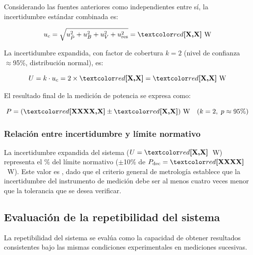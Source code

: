 Considerando las fuentes anteriores como independientes entre sí,
la incertidumbre estándar combinada es:

\begin{equation}
    u_c = \sqrt{u_{\bar{P}}^2 + u_B^2 + u_V^2 + u_{\text{res}}^2}
        = \PLACEHOLDER{X{,}X}~\text{W}
    \label{eq:incertidumbre_combinada}
\end{equation}

La incertidumbre expandida, con factor de cobertura $k=2$
(nivel de confianza $\approx$95\%, distribución normal), es:

\begin{equation}
    U = k \cdot u_c = 2 \times \PLACEHOLDER{X{,}X}
      = \PLACEHOLDER{X{,}X}~\text{W}
    \label{eq:incertidumbre_expandida}
\end{equation}

El resultado final de la medición de potencia se expresa como:

\begin{equation}
    P = (\PLACEHOLDER{XXXX{,}X} \pm \PLACEHOLDER{X{,}X})~\text{W}
        \quad (k=2,\; p \approx 95\%)
    \label{eq:resultado_final}
\end{equation}

\subsubsection{Relación entre incertidumbre y límite normativo}

La incertidumbre expandida del sistema ($U = \PLACEHOLDER{X{,}X}$~W)
representa el \% del límite normativo
($\pm$10\% de $P_{\text{dec}} = \PLACEHOLDER{XXXX}$~W).
Este valor es ,
dado que el criterio general de metrología establece que la
incertidumbre del instrumento de medición debe ser al menos
cuatro veces menor que la tolerancia que se desea verificar.

\subsection{Evaluación de la repetibilidad del sistema}
\label{subsec:repetibilidad}

La repetibilidad del sistema se evalúa como la capacidad de
obtener resultados consistentes bajo las mismas condiciones
experimentales en mediciones sucesivas.


